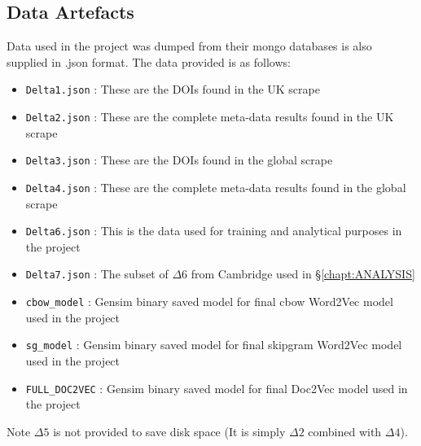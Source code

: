 \subsection{Data Artefacts}
Data used in the project was dumped from their mongo databases is also supplied in .json format. The data provided is as follows:
\begin{itemize}
\itemsep-.6em
\item \texttt{Delta1.json} : These are the DOIs found in the UK scrape
\item \texttt{Delta2.json} : These are the complete meta-data results found in the UK scrape
\item \texttt{Delta3.json} : These are the DOIs found in the global scrape
\item \texttt{Delta4.json} : These are the complete meta-data results found in the global scrape
\item \texttt{Delta6.json} : This is the data used for training and analytical purposes in the project
\item \texttt{Delta7.json} : The subset of $\Delta6$ from Cambridge used in \S\ref{chapt:ANALYSIS}
\item \texttt{cbow\_model} : Gensim binary saved model for final cbow Word2Vec model used in the project
\item \texttt{sg\_model} : Gensim binary saved model for final skipgram Word2Vec model used in the project
\item \texttt{FULL\_DOC2VEC} : Gensim binary saved model for final Doc2Vec model used in the project
\end{itemize}
Note $\Delta5$ is not provided to save disk space (It is simply $\Delta2$ combined with $\Delta4$).